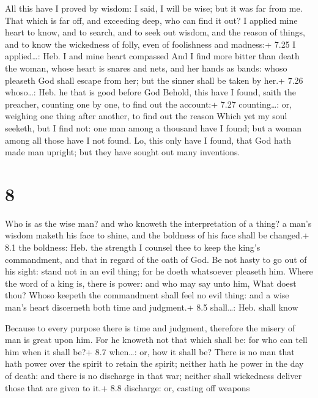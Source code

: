  All this have I proved by wisdom: I said, I will be
wise; but it was far from me.  That which is far off, and
exceeding deep, who can find it out?  I applied mine heart
to know, and to search, and to seek out wisdom, and the reason of
things, and to know the wickedness of folly, even of foolishness and
madness:+ 7.25 I applied\ldots: Heb. I and mine heart compassed
 And I find more bitter than death the woman, whose heart
is snares and nets, and her hands as bands: whoso pleaseth God shall
escape from her; but the sinner shall be taken by her.+ 7.26
whoso\ldots: Heb. he that is good before God  Behold, this
have I found, saith the preacher, counting one by one, to find out the
account:+ 7.27 counting\ldots: or, weighing one thing after another, to
find out the reason  Which yet my soul seeketh, but I find
not: one man among a thousand have I found; but a woman among all those
have I not found.  Lo, this only have I found, that God
hath made man upright; but they have sought out many inventions.

\hypertarget{section-7}{%
\section{8}\label{section-7}}

 Who is as the wise man? and who knoweth the interpretation
of a thing? a man's wisdom maketh his face to shine, and the boldness of
his face shall be changed.+ 8.1 the boldness: Heb. the strength
 I counsel thee to keep the king's commandment, and that in
regard of the oath of God.  Be not hasty to go out of his
sight: stand not in an evil thing; for he doeth whatsoever pleaseth him.
 Where the word of a king is, there is power: and who may
say unto him, What doest thou?  Whoso keepeth the
commandment shall feel no evil thing: and a wise man's heart discerneth
both time and judgment.+ 8.5 shall\ldots: Heb. shall know

 Because to every purpose there is time and judgment,
therefore the misery of man is great upon him.  For he
knoweth not that which shall be: for who can tell him when it shall be?+
8.7 when\ldots: or, how it shall be?  There is no man that
hath power over the spirit to retain the spirit; neither hath he power
in the day of death: and there is no discharge in that war; neither
shall wickedness deliver those that are given to it.+ 8.8 discharge: or,
casting off weapons

